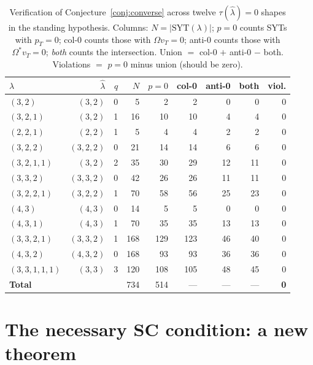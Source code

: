 \documentclass[11pt]{article}
\theoremstyle{definition}
\newcommand{\Om}{\Omega}
\newcommand{\Omstar}{\Omega^{\ast}}
\newcommand{\hatl}{\widehat\lambda}
\newcommand{\SYT}{\mathrm{SYT}}
\newcommand{\pT}{p_T}
\begin{document}
\begin{table}[h]
\centering\renewcommand{\arraystretch}{1.1}
\caption{Verification of Conjecture~\ref{conj:converse} across twelve
$\tau(\hatl) = 0$ shapes in the standing hypothesis. Columns:
$N = |\SYT(\lambda)|$; $p\!=\!0$ counts SYTs with $\pT = 0$; col-0 counts
those with $\Om v_T = 0$; anti-0 counts those with $\Omstar v_T = 0$;
\emph{both} counts the intersection. Union $=$ col-0 $+$ anti-0 $-$ both.
Violations $=$ $p\!=\!0$ minus union (should be zero).}
\label{tab:shapes}
\begin{tabular}{lrrrrrrrr}
\toprule
$\lambda$ & $\hatl$ & $q$ & $N$ & $p\!=\!0$ & col-0 & anti-0 & both & viol. \\
\midrule
$(3, 2)$           & $(3, 2)$    & 0 & 5   & 2   & 2   & 0  & 0  & 0 \\
$(3, 2, 1)$        & $(3, 2)$    & 1 & 16  & 10  & 10  & 4  & 4  & 0 \\
$(2, 2, 1)$        & $(2, 2)$    & 1 & 5   & 4   & 4   & 2  & 2  & 0 \\
$(3, 2, 2)$        & $(3, 2, 2)$ & 0 & 21  & 14  & 14  & 6  & 6  & 0 \\
$(3, 2, 1, 1)$     & $(3, 2)$    & 2 & 35  & 30  & 29  & 12 & 11 & 0 \\
$(3, 3, 2)$        & $(3, 3, 2)$ & 0 & 42  & 26  & 26  & 11 & 11 & 0 \\
$(3, 2, 2, 1)$     & $(3, 2, 2)$ & 1 & 70  & 58  & 56  & 25 & 23 & 0 \\
$(4, 3)$           & $(4, 3)$    & 0 & 14  & 5   & 5   & 0  & 0  & 0 \\
$(4, 3, 1)$        & $(4, 3)$    & 1 & 70  & 35  & 35  & 13 & 13 & 0 \\
$(3, 3, 2, 1)$     & $(3, 3, 2)$ & 1 & 168 & 129 & 123 & 46 & 40 & 0 \\
$(4, 3, 2)$        & $(4, 3, 2)$ & 0 & 168 & 93  & 93  & 36 & 36 & 0 \\
$(3, 3, 1, 1, 1)$ & $(3, 3)$    & 3 & 120 & 108 & 105 & 48 & 45 & 0 \\
\midrule
\textbf{Total}     &             &   & 734 & 514 & --- & ---& ---& \textbf{0} \\
\bottomrule
\end{tabular}
\end{table}

\section{The necessary SC condition: a new theorem}
\end{document}
